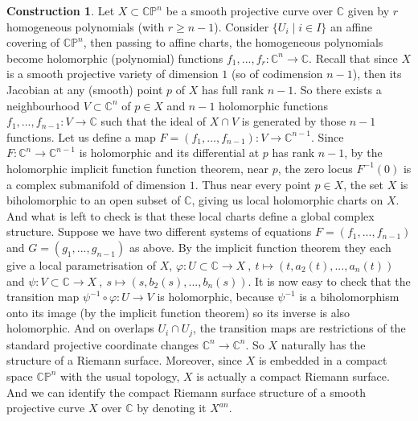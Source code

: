 \documentclass{article}
\theoremstyle{plain}
\theoremstyle{definition}
\newtheorem{construction}[theorem]{Construction}
\begin{document}
\begin{construction}
    Let $X\subset \mathbb{CP}^n$ be a smooth projective curve over $\mathbb{C}$ given by $r$ homogeneous polynomials (with $r\geq n-1$).
    Consider $\{U_i \mid i\in I\}$ an affine covering of $\mathbb{CP}^n$, then passing to affine charts, the homogeneous polynomials become holomorphic (polynomial) functions $f_1,...,f_r :\mathbb{C}^n\rightarrow \mathbb{C}$.
    Recall that since $X$ is a smooth projective variety of dimension $1$ (so of codimension $n-1$), then its Jacobian at any (smooth) point $p$ of $X$ has full rank $n-1$. 
    So there exists a neighbourhood $V\subset\mathbb{C}^n$ of $p\in X$ and $n-1$ holomorphic functions $f_1,...,f_{n-1}:V\rightarrow \mathbb{C}$ such that the ideal of $X\cap V$ is generated by those $n-1$ functions.
    Let us define a map $F=(f_1,...,f_{n-1}) : V\rightarrow \mathbb{C}^{n-1}$.
    Since $F:\mathbb{C}^n\rightarrow\mathbb{C}^{n-1}$ is holomorphic and its differential at $p$ has rank $n-1$, by the holomorphic implicit function function theorem, near $p$, the zero locus $F^{-1}(0)$ is a complex submanifold of dimension $1$.
    Thus near every point $p\in X$, the set $X$ is biholomorphic to an open subset of $\mathbb{C}$, giving us local holomorphic charts on $X$.\\
    And what is left to check is that these local charts define a global complex structure. 
    Suppose we have two different systems of equations  $F=(f_1,...,f_{n-1})$ and $G=(g_1,...,g_{n-1})$ as above.
    By the implicit function theorem they each give a local parametrisation of $X$, 
    $\varphi : U\subset \mathbb{C}\rightarrow X\: ,\:t\mapsto (t,a_2(t),...,a_n(t))$
    and $\psi : V\subset \mathbb{C}\rightarrow X\: ,\: s\mapsto(s,b_2(s),...,b_n(s))$.
    It is now easy to check that the transition map $\psi^{-1}\circ \varphi : U\rightarrow V$ is holomorphic, because $\psi^{-1}$ is a biholomorphism onto its image (by the implicit function theorem) so its inverse is also holomorphic.
    And on overlaps $U_i\cap U_j$, the transition maps are restrictions of the standard projective coordinate changes $\mathbb{C}^n\rightarrow \mathbb{C}^n$.
    So $X$ naturally has the structure of a Riemann surface. 
    Moreover, since $X$ is embedded in a compact space $\mathbb{CP}^n$ with the usual topology,
    $X$ is actually a compact Riemann surface. 
    And we can identify the compact Riemann surface structure of a smooth projective curve $X$ over $\mathbb{C}$ by denoting it $X^{an}$.
\end{construction}
\end{document}
